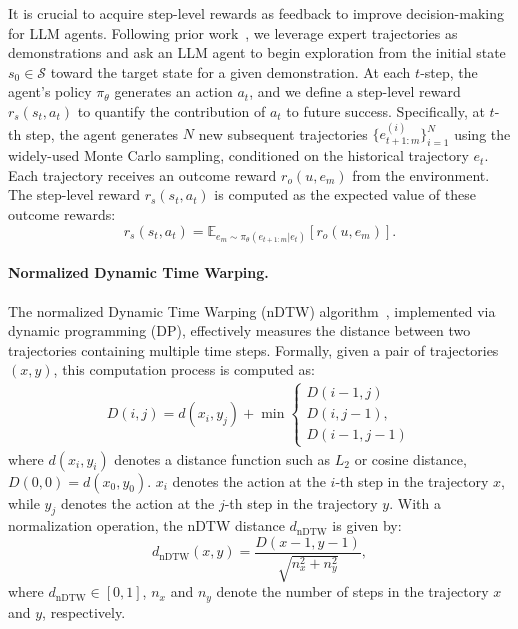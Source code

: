 It is crucial to acquire step-level rewards as feedback to improve decision-making for LLM agents.
Following prior work~\citep{kakade2002approximately,salimans2018learning,xiong2024watch}, we leverage expert trajectories as demonstrations and ask an LLM agent to begin exploration from the initial state $s_0\in\mathcal{S}$ toward the target state for a given demonstration. At each $t$-step, the agent's policy $\pi_\theta$ generates an action $a_t$, and we define a step-level reward $r_s(s_t, a_t)$ to quantify the contribution of $a_t$ to future success. 
Specifically, at $t$-th step, the agent generates $N$ new subsequent trajectories $\{e_{t+1:m}^{(i)}\}_{i=1}^{N}$ using the widely-used Monte Carlo sampling, conditioned on the historical trajectory $e_t$. Each trajectory receives an outcome reward $r_o(u,e_m)$ from the environment. The step-level reward $r_s(s_t, a_t)$ is computed as the expected value of these outcome rewards:
\begin{equation}
    r_s(s_t, a_t) = \mathbb E_{e_m \sim \pi_{\theta}(e_{t+1:m}|e_{t})} [r_o(u, e_m)].
\end{equation}


\paragraph{Normalized Dynamic Time Warping.}
\label{sec:distance_measure}
The normalized Dynamic Time Warping (nDTW) algorithm~\cite{muller2007dynamic}, implemented via dynamic programming (DP), effectively measures the distance between two trajectories containing multiple time steps. Formally, given a pair of trajectories $(x, y)$, this computation process is computed as:
\begin{align}
    D(i,j) = d(x_i, y_j) + 
        \min \begin{cases} 
            D(i-1, j) \\ 
            D(i, j-1),\\ 
            D(i-1, j-1)
        \end{cases}
\label{eq:nDTW}
\end{align}
where $d(x_i,y_i)$ denotes a distance function such as $L_2$ or cosine distance, $D(0,0)=d(x_0,y_0)$. $x_i$ denotes the action at the $i$-th step in the trajectory $x$, while $y_j$ denotes the action at the $j$-th step in the trajectory $y$. With a normalization operation, the nDTW distance $d_{\text{nDTW}}$ is given by:
\begin{equation}
    d_{\text{nDTW}}(x,y) = \frac{D(x-1, y-1)}{\sqrt{n_{x}^2 + n_{y}^2}},
\end{equation}
where $d_{\text{nDTW}}\in [0,1]$, $n_{x}$ and $n_{y}$ denote the number of steps in the trajectory $x$ and $y$, respectively. 
